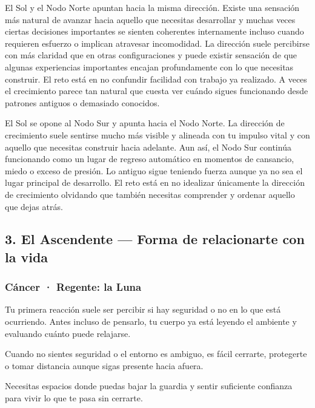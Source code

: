 \documentclass[11pt,a4paper]{article}
\begin{document}
El Sol y el Nodo Norte apuntan hacia la misma dirección. Existe una sensación más natural de avanzar hacia aquello que necesitas desarrollar y muchas veces ciertas decisiones importantes se sienten coherentes internamente incluso cuando requieren esfuerzo o implican atravesar incomodidad. La dirección suele percibirse con más claridad que en otras configuraciones y puede existir sensación de que algunas experiencias importantes encajan profundamente con lo que necesitas construir. El reto está en no confundir facilidad con trabajo ya realizado. A veces el crecimiento parece tan natural que cuesta ver cuándo sigues funcionando desde patrones antiguos o demasiado conocidos.

El Sol se opone al Nodo Sur y apunta hacia el Nodo Norte. La dirección de crecimiento suele sentirse mucho más visible y alineada con tu impulso vital y con aquello que necesitas construir hacia adelante. Aun así, el Nodo Sur continúa funcionando como un lugar de regreso automático en momentos de cansancio, miedo o exceso de presión. Lo antiguo sigue teniendo fuerza aunque ya no sea el lugar principal de desarrollo. El reto está en no idealizar únicamente la dirección de crecimiento olvidando que también necesitas comprender y ordenar aquello que dejas atrás.


\vspace{0.5cm}


\subsection{3. El Ascendente — Forma de relacionarte con la vida}

\subsubsection*{Cáncer · Regente: la Luna}

Tu primera reacción suele ser percibir si hay seguridad o no en lo que está ocurriendo. Antes incluso de pensarlo, tu cuerpo ya está leyendo el ambiente y evaluando cuánto puede relajarse.

Cuando no sientes seguridad o el entorno es ambiguo, es fácil cerrarte, protegerte o tomar distancia aunque sigas presente hacia afuera.

Necesitas espacios donde puedas bajar la guardia y sentir suficiente confianza para vivir lo que te pasa sin cerrarte.
\end{document}
